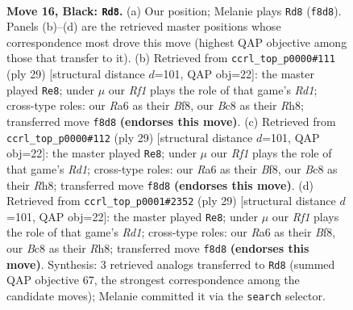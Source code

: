 \documentclass[11pt]{article}
\begin{document}
\clearpage

\begin{figure}[p]\centering
\begin{subfigure}{0.46\textwidth}\centering
\resizebox{\linewidth}{!}{%
\newchessgame
\chessboard[
  setfen={2b2r1k/1p2qp1p/r1nb1np1/p2Q4/P3P3/1P3NP1/1B3PBP/RN2R1K1 b - - 0 16},
  showmover=false,
  pgfstyle=straightmove, color=movearrow, markmove={f8-d8}
]}
\caption{}
\end{subfigure}\hfill
\begin{subfigure}{0.46\textwidth}\centering
\resizebox{\linewidth}{!}{%
\newchessgame
\chessboard[
  setfen={2kr1b1r/1ppq2pp/p1n2pb1/3n4/Q2PN3/2PB4/PP4PP/R1B1NRK1 b - - 5 15},
  showmover=false,
  pgfstyle=straightmove, color=movearrow, markmove={d8-e8}
]}
\caption{}
\end{subfigure}
\\[4pt]
\begin{subfigure}{0.46\textwidth}\centering
\resizebox{\linewidth}{!}{%
\newchessgame
\chessboard[
  setfen={2kr1b1r/1ppq2pp/p1n2pb1/3n4/Q2PN3/2PB4/PP4PP/R1B1NRK1 b - - 5 15},
  showmover=false,
  pgfstyle=straightmove, color=movearrow, markmove={d8-e8}
]}
\caption{}
\end{subfigure}\hfill
\begin{subfigure}{0.46\textwidth}\centering
\resizebox{\linewidth}{!}{%
\newchessgame
\chessboard[
  setfen={2kr1b1r/1ppq2pp/p1n2pb1/3n4/Q2PN3/2PB4/PP4PP/R1B1NRK1 b - - 5 15},
  showmover=false,
  pgfstyle=straightmove, color=movearrow, markmove={d8-e8}
]}
\caption{}
\end{subfigure}
\caption{\textbf{Move 16, Black: \texttt{Rd8}.} (a) Our position; Melanie plays \texttt{Rd8} (\texttt{f8d8}). Panels (b)--(d) are the retrieved master positions whose correspondence most drove this move (highest QAP objective among those that transfer to it). (b) Retrieved from \texttt{ccrl\_top\_p0000\#111} (ply 29) [structural distance $d$=101, QAP obj=22]: the master played \texttt{Re8}; under $\mu$ our \emph{Rf1} plays the role of that game's \emph{Rd1}; cross-type roles: our \emph{R}a6 as their \emph{B}f8, our \emph{B}c8 as their \emph{R}h8; transferred move \texttt{f8d8} \textbf{(endorses this move)}. (c) Retrieved from \texttt{ccrl\_top\_p0000\#112} (ply 29) [structural distance $d$=101, QAP obj=22]: the master played \texttt{Re8}; under $\mu$ our \emph{Rf1} plays the role of that game's \emph{Rd1}; cross-type roles: our \emph{R}a6 as their \emph{B}f8, our \emph{B}c8 as their \emph{R}h8; transferred move \texttt{f8d8} \textbf{(endorses this move)}. (d) Retrieved from \texttt{ccrl\_top\_p0001\#2352} (ply 29) [structural distance $d$=101, QAP obj=22]: the master played \texttt{Re8}; under $\mu$ our \emph{Rf1} plays the role of that game's \emph{Rd1}; cross-type roles: our \emph{R}a6 as their \emph{B}f8, our \emph{B}c8 as their \emph{R}h8; transferred move \texttt{f8d8} \textbf{(endorses this move)}. Synthesis: 3 retrieved analogs transferred to \texttt{Rd8} (summed QAP objective 67, the strongest correspondence among the candidate moves); Melanie committed it via the \texttt{search} selector.}
\label{fig:thought-m31}
\end{figure}
\end{document}
